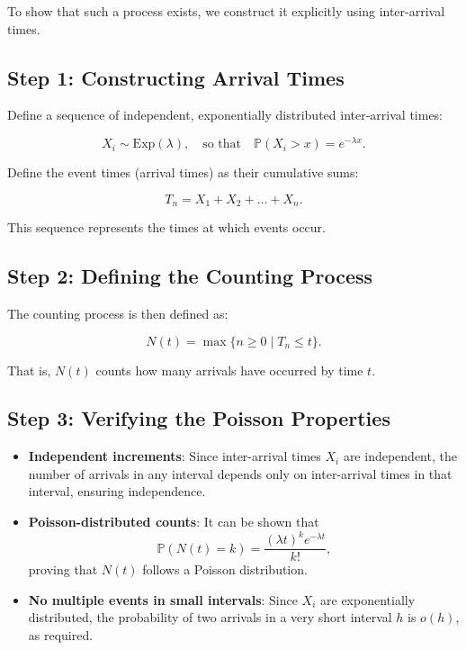 \documentclass{article}
\begin{document}
To show that such a process exists, we construct it explicitly using inter-arrival times.

\subsection*{Step 1: Constructing Arrival Times}

Define a sequence of independent, exponentially distributed inter-arrival times:

\[
X_i \sim \text{Exp}(\lambda), \quad \text{so that} \quad \mathbb{P}(X_i > x) = e^{-\lambda x}.
\]

Define the event times (arrival times) as their cumulative sums:

\[
T_n = X_1 + X_2 + \dots + X_n.
\]

This sequence represents the times at which events occur.

\subsection*{Step 2: Defining the Counting Process}

The counting process is then defined as:

\[
N(t) = \max \{n \geq 0 \mid T_n \leq t\}.
\]

That is, \( N(t) \) counts how many arrivals have occurred by time \( t \).

\subsection*{Step 3: Verifying the Poisson Properties}

\begin{itemize}
    \item \textbf{Independent increments}: Since inter-arrival times \( X_i \) are independent, the number of arrivals in any interval depends only on inter-arrival times in that interval, ensuring independence.
    \item \textbf{Poisson-distributed counts}: It can be shown that
    \[
    \mathbb{P}(N(t) = k) = \frac{(\lambda t)^k e^{-\lambda t}}{k!},
    \]
    proving that \( N(t) \) follows a Poisson distribution.
    \item \textbf{No multiple events in small intervals}: Since \( X_i \) are exponentially distributed, the probability of two arrivals in a very short interval \( h \) is \( o(h) \), as required.
\end{itemize}
\end{document}
